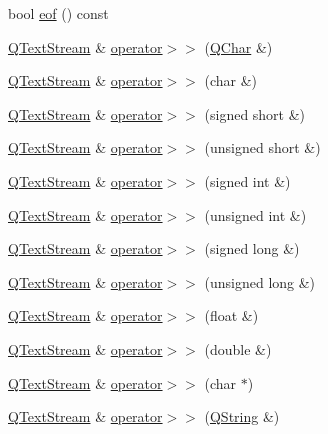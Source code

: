 \begin{DoxyCompactItemize}
bool \mbox{\hyperlink{class_q_text_stream_ad872bf98aaeea64f9e0f45aaf2a59213}{eof}} () const
\item 
\mbox{\hyperlink{class_q_text_stream}{Q\+Text\+Stream}} \& \mbox{\hyperlink{class_q_text_stream_a4d06cd74325e6420974f01156bdfc52a}{operator$>$$>$}} (\mbox{\hyperlink{class_q_char}{Q\+Char}} \&)
\item 
\mbox{\hyperlink{class_q_text_stream}{Q\+Text\+Stream}} \& \mbox{\hyperlink{class_q_text_stream_a71c417d8225d836e27b1854751f5ff5a}{operator$>$$>$}} (char \&)
\item 
\mbox{\hyperlink{class_q_text_stream}{Q\+Text\+Stream}} \& \mbox{\hyperlink{class_q_text_stream_a075cf521ee2f67e28c246cba2aa50102}{operator$>$$>$}} (signed short \&)
\item 
\mbox{\hyperlink{class_q_text_stream}{Q\+Text\+Stream}} \& \mbox{\hyperlink{class_q_text_stream_a5066c61f0e08736f3b99fffd02041a1f}{operator$>$$>$}} (unsigned short \&)
\item 
\mbox{\hyperlink{class_q_text_stream}{Q\+Text\+Stream}} \& \mbox{\hyperlink{class_q_text_stream_a220a232b218047c458f9e0a445b76831}{operator$>$$>$}} (signed int \&)
\item 
\mbox{\hyperlink{class_q_text_stream}{Q\+Text\+Stream}} \& \mbox{\hyperlink{class_q_text_stream_ae591ec4f654abd8450583b3a60a5015a}{operator$>$$>$}} (unsigned int \&)
\item 
\mbox{\hyperlink{class_q_text_stream}{Q\+Text\+Stream}} \& \mbox{\hyperlink{class_q_text_stream_aecfdad0a90cd7b4093b08a9d032d8563}{operator$>$$>$}} (signed long \&)
\item 
\mbox{\hyperlink{class_q_text_stream}{Q\+Text\+Stream}} \& \mbox{\hyperlink{class_q_text_stream_a68deb1875213bffc9334eb83c73210c2}{operator$>$$>$}} (unsigned long \&)
\item 
\mbox{\hyperlink{class_q_text_stream}{Q\+Text\+Stream}} \& \mbox{\hyperlink{class_q_text_stream_abd9ed695feef50e0dc72f0f366b5a4d8}{operator$>$$>$}} (float \&)
\item 
\mbox{\hyperlink{class_q_text_stream}{Q\+Text\+Stream}} \& \mbox{\hyperlink{class_q_text_stream_a7c671bbb530d2187da84d51141b540cd}{operator$>$$>$}} (double \&)
\item 
\mbox{\hyperlink{class_q_text_stream}{Q\+Text\+Stream}} \& \mbox{\hyperlink{class_q_text_stream_a52cffa4947a97d83d13aae06575820f4}{operator$>$$>$}} (char $\ast$)
\item 
\mbox{\hyperlink{class_q_text_stream}{Q\+Text\+Stream}} \& \mbox{\hyperlink{class_q_text_stream_a5f007c3a4d7d63a260048cf73ba19acc}{operator$>$$>$}} (\mbox{\hyperlink{class_q_string}{Q\+String}} \&)

\end{DoxyCompactItemize}
